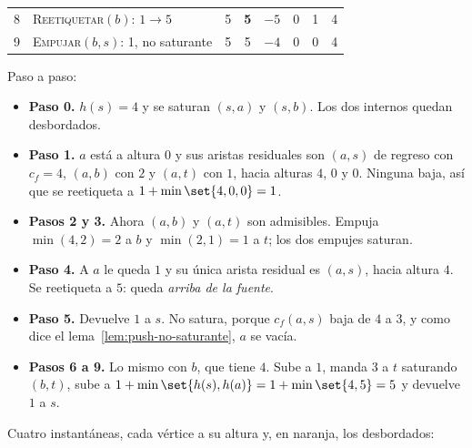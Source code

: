 \documentclass[11pt,letterpaper]{article}
\begin{document}
\begin{ejemplo}
\begin{center}
\begin{tabular}{rlcccccc}
    8 & \textsc{Reetiquetar}$(b)$: $1 \to 5$ & 5 & \textbf{5}
      & $-5$ & 0 & 1 & 4 \\
    9 & \textsc{Empujar}$(b, s)$: 1, no saturante & 5 & 5
      & $-4$ & 0 & 0 & 4 \\
    \bottomrule
  \end{tabular}
  \end{center}
  Paso a paso:
  \begin{itemize}
    \item \textbf{Paso 0.} $h(s) = 4$ y se saturan $(s, a)$ y
          $(s, b)$. Los dos internos quedan desbordados.
    \item \textbf{Paso 1.} $a$ está a altura $0$ y sus aristas
          residuales son $(a, s)$ de regreso con $c_f = 4$, $(a, b)$
          con $2$ y $(a, t)$ con $1$, hacia alturas $4$, $0$ y $0$.
          Ninguna baja, así que se reetiqueta a
          $1 + \min\set{4, 0, 0} = 1$.
    \item \textbf{Pasos 2 y 3.} Ahora $(a, b)$ y $(a, t)$ son
          admisibles. Empuja $\min(4, 2) = 2$ a $b$ y $\min(2, 1) = 1$
          a $t$; los dos empujes saturan.
    \item \textbf{Paso 4.} A $a$ le queda $1$ y su única arista
          residual es $(a, s)$, hacia altura $4$. Se reetiqueta a $5$:
          queda \emph{arriba de la fuente}.
    \item \textbf{Paso 5.} Devuelve $1$ a $s$. No satura, porque
          $c_f(a, s)$ baja de $4$ a $3$, y como dice el
          lema~\ref{lem:push-no-saturante}, $a$ se vacía.
    \item \textbf{Pasos 6 a 9.} Lo mismo con $b$, que tiene $4$. Sube a
          $1$, manda $3$ a $t$ saturando $(b, t)$, sube a
          $1 + \min\set{h(s), h(a)} = 1 + \min\set{4, 5} = 5$ y
          devuelve $1$ a $s$.
  \end{itemize}
  Cuatro instantáneas, cada vértice a su altura y, en naranja, los
  desbordados:
  \begin{center}
\end{center}
\end{ejemplo}
\end{document}
